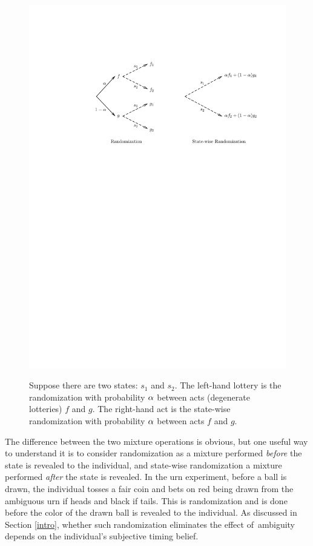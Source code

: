 \documentclass[12pt, notitlepage]{article}
\begin{document}
\begin{figure}[h!]
  \centering   \label{fig_rswr}
    \includegraphics{img/eaep_main.pdf}
    \caption{Suppose there are
two states: $s_{1}$ and $s_{2}$. The left-hand lottery is the randomization
with probability $\protect\alpha $ between acts (degenerate lotteries) $f$
and $g$. The right-hand act is the state-wise randomization with probability 
$\protect\alpha $ between acts $f$ and $g$.}
\end{figure}


The difference between the two mixture operations is obvious, but one useful
way to understand it is to consider randomization as a mixture performed 
\textit{before} the state is revealed to the individual, and state-wise
randomization a mixture performed \textit{after} the state is revealed. In
the urn experiment, before a ball is drawn, the individual tosses a fair
coin and bets on red being drawn from the ambiguous urn if heads and black
if tails. This is randomization and is done before the color of the drawn
ball is revealed to the individual. As discussed in Section \ref{intro},
whether such randomization eliminates the effect of\ ambiguity depends on
the individual's subjective timing belief.
\end{document}
